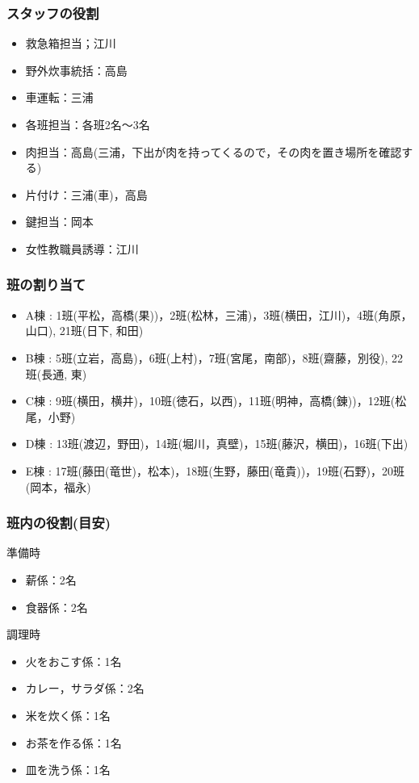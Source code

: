 \subsubsection{スタッフの役割}
\begin{itemize}
  \item 救急箱担当；江川
  \item 野外炊事統括：高島
  \item 車運転：三浦
  \item 各班担当：各班2名〜3名
  \item 肉担当：高島(三浦，下出が肉を持ってくるので，その肉を置き場所を確認する)
　\item 片付け：三浦(車)，高島
  \item 鍵担当：岡本
  \item 女性教職員誘導：江川
\end{itemize}

\subsubsection{班の割り当て}
\begin{itemize}
 \item A棟 : 1班(平松，高橋(果))，2班(松林，三浦)，3班(横田，江川)，4班(角原，山口), 21班(日下, 和田)
 \item B棟 : 5班(立岩，高島)，6班(上村)，7班(宮尾，南部)，8班(齋藤，別役), 22班(長通, 東)
 \item C棟 : 9班(横田，横井)，10班(徳石，以西)，11班(明神，高橋(錬))，12班(松尾，小野)
 \item D棟 : 13班(渡辺，野田)，14班(堀川，真壁)，15班(藤沢，横田)，16班(下出)
 \item E棟 : 17班(藤田(竜世)，松本)，18班(生野，藤田(竜貴))，19班(石野)，20班(岡本，福永)
\end{itemize}

\subsubsection{班内の役割(目安)}

準備時
\begin{itemize}
  \item 薪係：2名
  \item 食器係：2名
\end{itemize}

調理時
\begin{itemize}
  \item 火をおこす係：1名
  \item カレー，サラダ係：2名
  \item 米を炊く係：1名
  \item お茶を作る係：1名
  \item 皿を洗う係：1名
\end{itemize}

